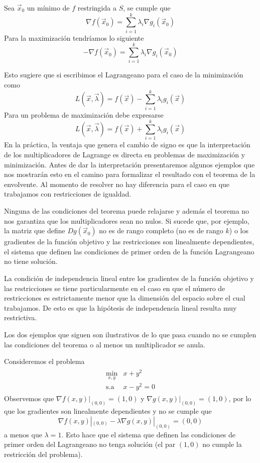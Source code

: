 Sea $\vec{x}_0$ un m\'inimo de $f$ restringida a $S$, se cumple que
$$\nabla f(\vec{x}_0) = \sum_{i=1}^k \lambda_i \nabla g_i (\vec{x}_0)$$
Para la maximizaci\'on tendr\'iamos lo siguiente
$$-\nabla f(\vec{x}_0)= \sum_{i=1}^k \lambda_i \nabla g_i (\vec{x}_0)$$

Esto sugiere que si escribimos el Lagrangeano para el caso de la minimizaci\'on como
$$L(\vec{x},\vec{\lambda}) = f(\vec{x}) - \sum_{i=1}^k \lambda_i g_i(\vec{x})$$
Para un problema de maximizaci\'on debe expresarse
$$L(\vec{x},\vec{\lambda}) = f(\vec{x}) + \sum_{i=1}^k \lambda_i g_i(\vec{x})$$
En la pr\'actica, la ventaja que genera el cambio de signo es que la interpretaci\'on de los multiplicadores de Lagrange es directa en problemas de maximizaci\'on y minimizaci\'on. Antes de dar la interpretaci\'on presentaremos algunos ejemplos que nos mostrar\'an esto en el camino para formalizar el resultado con el teorema de la envolvente. Al momento de resolver no hay diferencia para el caso en que trabajamos con restricciones de igualdad.

\begin{nota}
Ninguna de las condiciones del teorema puede relajarse y adem\'as el teorema no nos garantiza que los multiplicadores sean no nulos. Si sucede que, por ejemplo, la matriz que define $Dg(\vec{x}_0)$ no es de rango completo (no es de rango $k$) o los gradientes de la funci\'on objetivo y las restricciones son linealmente dependientes, el sistema que definen las condiciones de primer orden de la funci\'on Lagrangeano no tiene soluci\'on. 

La condici\'on de independencia lineal entre los gradientes de la funci\'on objetivo y las restricciones se tiene particularmente en el caso en que el n\'umero de restricciones es estrictamente menor que la dimensi\'on del espacio sobre el cual trabajamos. De esto es que la hip\'otesis de independencia lineal resulta muy restrictiva.
\end{nota}

Los dos ejemplos que siguen son ilustrativos de lo que pasa cuando no se cumplen las condiciones del teorema o al menos un multiplicador se anula.

\begin{ejemplo} Consideremos el problema
\begin{eqnarray*}
\begin{array}{cc}
\displaystyle \min_{x,y} & x+y^2   \\
\text{s.a}  			 & x-y^2=0
\end{array}
\end{eqnarray*}
Observemos que $\nabla f(x,y)|_{(0,0)}= (1,0)$ y $\nabla g(x,y)|_{(0,0)}=(1,0)$, por lo que los gradientes son linealmente dependientes y no se cumple que 
$$\nabla f(x,y)|_{(0,0)} - \lambda \nabla g(x,y)|_{(0,0)}=(0,0)$$ 
a menos que $\lambda = 1$. Esto hace que el sistema que definen las condiciones de primer orden del Lagrangeano no tenga soluci\'on (el par $(1,0)$ no cumple la restricci\'on del problema).
\end{ejemplo}


